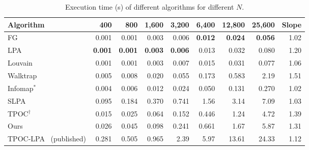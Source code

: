 \documentclass[conference]{IEEEtran}
\begin{document}
\begin{table}[t]
\centering
\caption{Execution time (s) of different algorithms for different $N$.}
\label{tab:lat}
\scriptsize
\begin{tabular}{lrrrrrrrr}
\toprule
Algorithm & 400 & 800 & 1{,}600 & 3{,}200 & 6{,}400 & 12{,}800 & 25{,}600 & Slope \\
\midrule
FG & 0.001 & 0.001 & 0.003 & 0.006 & \textbf{0.012} & \textbf{0.024} & \textbf{0.056} & 1.02 \\
LPA & \textbf{0.001} & \textbf{0.001} & \textbf{0.003} & \textbf{0.006} & 0.013 & 0.032 & 0.080 & 1.20 \\
Louvain & 0.001 & 0.001 & 0.003 & 0.007 & 0.015 & 0.031 & 0.077 & 1.06 \\
Walktrap & 0.005 & 0.008 & 0.020 & 0.055 & 0.173 & 0.583 & 2.19 & 1.51 \\
Infomap$^{*}$ & 0.004 & 0.006 & 0.012 & 0.024 & 0.050 & 0.131 & 0.270 & 1.02 \\
SLPA & 0.095 & 0.184 & 0.370 & 0.741 & 1.56 & 3.14 & 7.09 & 1.03 \\
TPOC$^{\dagger}$ & 0.015 & 0.025 & 0.064 & 0.152 & 0.446 & 1.24 & 4.72 & 1.39 \\
Ours & 0.026 & 0.045 & 0.098 & 0.241 & 0.661 & 1.67 & 5.87 & 1.31 \\
\midrule
TPOC-LPA~\cite{kong2026} (published) & 0.281 & 0.505 & 0.965 & 2.39 & 5.97 & 13.61 & 24.33 & 1.12 \\
\bottomrule
\end{tabular}
\end{table}
\end{document}
